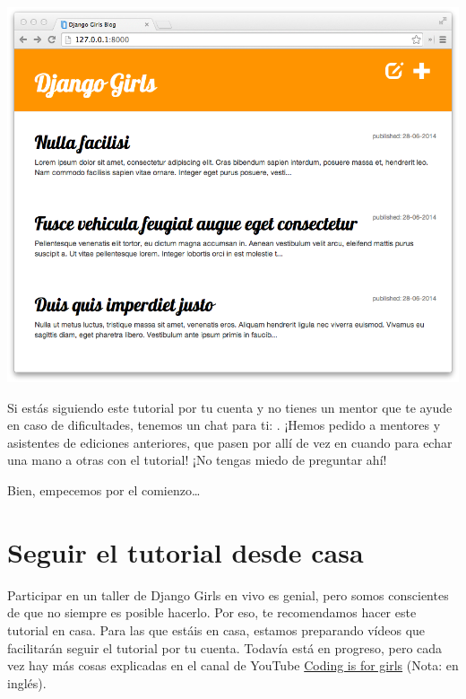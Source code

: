 \documentclass[
  a4paper,
  DIV=11,
  numbers=noendperiod,
  onepage,
  openany]{scrreprt}
\begin{document}
\includegraphics{unidades/unidad1/images/paste-2.png}

\begin{tcolorbox}[enhanced jigsaw, breakable, opacityback=0, toptitle=1mm, bottomrule=.15mm, opacitybacktitle=0.6, colback=white, arc=.35mm, colframe=quarto-callout-tip-color-frame, left=2mm, colbacktitle=quarto-callout-tip-color!10!white, rightrule=.15mm, bottomtitle=1mm, titlerule=0mm, leftrule=.75mm, coltitle=black, toprule=.15mm, title=\textcolor{quarto-callout-tip-color}{\faLightbulb}\hspace{0.5em}{Tip}]

Si estás siguiendo este tutorial por tu cuenta y no tienes un mentor que
te ayude en caso de dificultades, tenemos un chat para ti:
\href{https://gitter.im/DjangoGirls/tutorial}{}.
¡Hemos pedido a mentores y asistentes de ediciones anteriores, que pasen
por allí de vez en cuando para echar una mano a otras con el tutorial!
¡No tengas miedo de preguntar ahí!

\end{tcolorbox}

Bien, empecemos por el comienzo\ldots{}

\chapter{Seguir el tutorial desde
casa}\label{seguir-el-tutorial-desde-casa}

Participar en un taller de Django Girls en vivo es genial, pero somos
conscientes de que no siempre es posible hacerlo. Por eso, te
recomendamos hacer este tutorial en casa. Para las que estáis en casa,
estamos preparando vídeos que facilitarán seguir el tutorial por tu
cuenta. Todavía está en progreso, pero cada vez hay más cosas explicadas
en el canal de YouTube
\href{https://www.youtube.com/channel/UC0hNd2uW8jTR5K3KBzRuG2A/feed}{Coding
is for girls} (Nota: en inglés).
\end{document}
